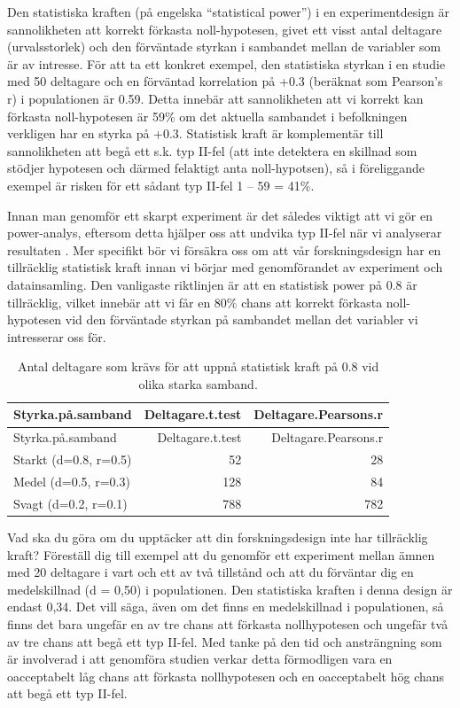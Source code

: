 \documentclass[
]{book}
\begin{document}
Den statistiska kraften (på engelska ``statistical power'') i en experimentdesign är sannolikheten att korrekt förkasta noll-hypotesen, givet ett visst antal deltagare (urvalsstorlek) och den förväntade styrkan i sambandet mellan de variabler som är av intresse. För att ta ett konkret exempel, den statistiska styrkan i en studie med 50 deltagare och en förväntad korrelation på +0.3 (beräknat som Pearson's r) i populationen är 0.59. Detta innebär att sannolikheten att vi korrekt kan förkasta noll-hypotesen är 59\% om det aktuella sambandet i befolkningen verkligen har en styrka på +0.3. Statistisk kraft är komplementär till sannolikheten att begå ett s.k. typ II-fel (att inte detektera en skillnad som stödjer hypotesen och därmed felaktigt anta noll-hypotsen), så i föreliggande exempel är risken för ett sådant typ II-fel 1 -- 59 = 41\%.

Innan man genomför ett skarpt experiment är det således viktigt att vi gör en power-analys, eftersom detta hjälper oss att undvika typ II-fel när vi analyserar resultaten \citep{cohen1992power}. Mer specifikt bör vi försäkra oss om att vår forskningsdesign har en tillräcklig statistisk kraft innan vi börjar med genomförandet av experiment och datainsamling. Den vanligaste riktlinjen är att en statistisk power på 0.8 är tillräcklig, vilket innebär att vi får en 80\% chans att korrekt förkasta noll-hypotesen vid den förväntade styrkan på sambandet mellan det variabler vi intresserar oss för.

\begin{longtable}[]{@{}lrr@{}}
\caption{\label{tab:tab-02-07-1-1}Antal deltagare som krävs för att uppnå statistisk kraft på 0.8 vid olika starka samband.}\tabularnewline
\toprule
Styrka.på.samband & Deltagare.t.test & Deltagare.Pearsons.r\tabularnewline
\midrule
\endfirsthead
\toprule
Styrka.på.samband & Deltagare.t.test & Deltagare.Pearsons.r\tabularnewline
\midrule
\endhead
Starkt (d=0.8, r=0.5) & 52 & 28\tabularnewline
Medel (d=0.5, r=0.3) & 128 & 84\tabularnewline
Svagt (d=0.2, r=0.1) & 788 & 782\tabularnewline
\bottomrule
\end{longtable}

Vad ska du göra om du upptäcker att din forskningsdesign inte har tillräcklig kraft? Föreställ dig till exempel att du genomför ett experiment mellan ämnen med 20 deltagare i vart och ett av två tillstånd och att du förväntar dig en medelskillnad (d = 0,50) i populationen. Den statistiska kraften i denna design är endast 0,34. Det vill säga, även om det finns en medelskillnad i populationen, så finns det bara ungefär en av tre chans att förkasta nollhypotesen och ungefär två av tre chans att begå ett typ II-fel. Med tanke på den tid och ansträngning som är involverad i att genomföra studien verkar detta förmodligen vara en oacceptabelt låg chans att förkasta nollhypotesen och en oacceptabelt hög chans att begå ett typ II-fel.
\end{document}
